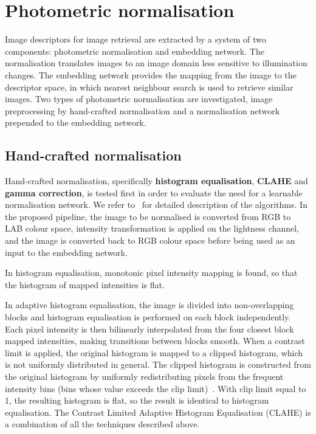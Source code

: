 \section{Photometric normalisation}

Image descriptors for image retrieval are extracted by a system of two components: photometric normalisation and embedding network. The normalisation translates images to an image domain less sensitive to illumination changes. The embedding network provides the mapping from the image to the descriptor space, in which  nearest neighbour search is used to retrieve similar images.
Two types of photometric normalisation are investigated, image preprocessing by hand-crafted normalisation and a normalisation network prepended to the embedding network.
 
\subsection{Hand-crafted normalisation}

Hand-crafted normalisation, specifically {\bf histogram equalisation}, {\bf CLAHE} and {\bf gamma correction}, is tested first in order to evaluate the need for a learnable normalisation network. We refer to~\cite{szeliski2010computer} for detailed  description of the algorithms. In the proposed pipeline, the image to be normalised is converted from RGB to LAB colour space, intensity transformation is applied on the lightness channel, and the image is converted back to RGB colour space before being used as an input to the embedding network.

In histogram equalisation, monotonic pixel intensity mapping is found, so that the histogram of mapped intensities is flat. 

In adaptive histogram equalisation, the image is divided into non-overlapping blocks and histogram equalisation is performed on each block independently. Each pixel intensity is then bilinearly interpolated from the four closest block mapped intensities, making transitions between blocks smooth. 
When a contrast limit is applied, the original histogram is mapped to a clipped histogram, which is not uniformly distributed in general.
The clipped histogram is constructed from the original histogram by uniformly redistributing pixels from the frequent intensity bins (bins whose value exceeds the clip limit)~\cite{szeliski2010computer}.
With clip limit equal to 1, the resulting histogram is flat, so the result is identical to histogram equalisation. The Contrast Limited Adaptive Histogram Equalisation (CLAHE) is a combination of all the techniques described above.

